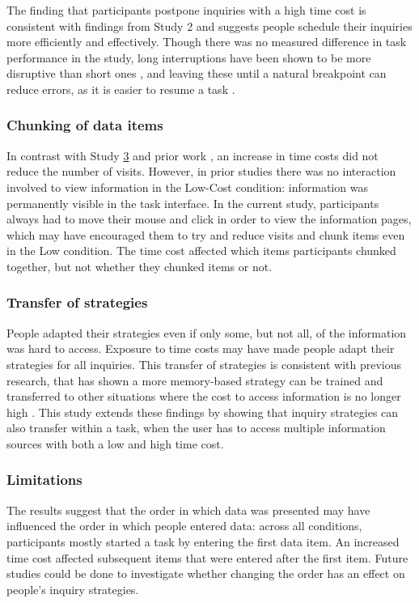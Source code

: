 The finding that participants postpone inquiries with a high time cost is consistent with findings from Study 2 and suggests people schedule their inquiries more efficiently and effectively. Though there was no measured difference in task performance in the study, long interruptions have been shown to be more disruptive than short ones \citep{Altmann2017, Monk2008}, and leaving these until a natural breakpoint can reduce errors, as it is easier to resume a task \citep{Gould2013a, Iqbal2005}.

\subsubsection{Chunking of data items}
In contrast with Study \hyperref[st:Study3]{3} and prior work \citep{Gray2006}, an increase in time costs did not reduce the number of visits. However, in prior studies there was no interaction involved to view information in the Low-Cost condition: information was permanently visible in the task interface. In the current study, participants always had to move their mouse and click in order to view the information pages, which may have encouraged them to try and reduce visits and chunk items even in the Low condition. The time cost affected which items participants chunked together, but not whether they chunked items or not.

\subsubsection{Transfer of strategies}
People adapted their strategies even if only some, but not all, of the information was hard to access. Exposure to time costs may have made people adapt their strategies for all inquiries. This transfer of strategies is consistent with previous research, that has shown a more memory-based strategy can be trained and transferred to other situations where the cost to access information is no longer high \citep{Patrick2014}. This study extends these findings by showing that inquiry strategies can also transfer within a task, when the user has to access multiple information sources with both a low and high time cost.

\subsubsection{Limitations}

The results suggest that the order in which data was presented may have influenced the order in which people entered data: across all conditions, participants mostly started a task by entering the first data item. An increased time cost affected subsequent items that were entered after the first item. Future studies could be done to investigate whether changing the order has an effect on people's inquiry strategies.

